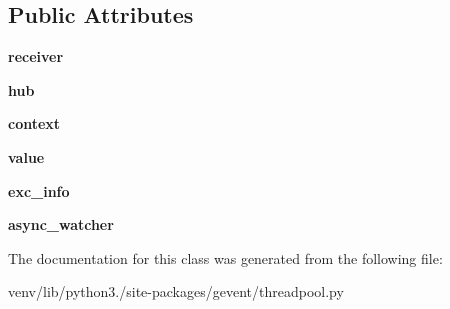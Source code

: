 \subsection*{Public Attributes}
\begin{DoxyCompactItemize}
\item 
\mbox{\label{classgevent_1_1threadpool_1_1_thread_result_aa9b9791e2ba8deee4258535dc534cc48}} 
{\bfseries receiver}
\item 
\mbox{\label{classgevent_1_1threadpool_1_1_thread_result_add746ed1652fc80fe49a009dc0896aee}} 
{\bfseries hub}
\item 
\mbox{\label{classgevent_1_1threadpool_1_1_thread_result_a59ae7e05bb1a548b2b9b427260045ff9}} 
{\bfseries context}
\item 
\mbox{\label{classgevent_1_1threadpool_1_1_thread_result_abcaec01de30c6eff299ceb32aef85b09}} 
{\bfseries value}
\item 
\mbox{\label{classgevent_1_1threadpool_1_1_thread_result_a30e9a82d1420f574d3248c7fe29b65b8}} 
{\bfseries exc\+\_\+info}
\item 
\mbox{\label{classgevent_1_1threadpool_1_1_thread_result_a2df6e0319b8059432aca325e72f34f40}} 
{\bfseries async\+\_\+watcher}
\end{DoxyCompactItemize}


The documentation for this class was generated from the following file\+:\begin{DoxyCompactItemize}
\item 
venv/lib/python3./site-\/packages/gevent/threadpool.\+py\end{DoxyCompactItemize}
